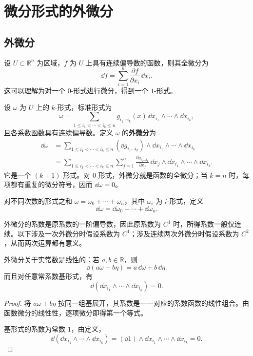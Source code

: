 \section{微分形式的外微分}

\subsection*{外微分}
设 $U\subset\mathbb R^n$ 为区域，$f$ 为 $U$ 上具有连续偏导数的函数，则其全微分为
\[
\dd f=\sum_{i=1}^n\frac{\partial f}{\partial x_i}\,\dd x_i.
\]
这可以理解为对一个 $0$-形式进行微分，得到一个 $1$-形式。

\begin{definition}
设 $\omega$ 为 $U$ 上的 $k$-形式，标准形式为
\[
\omega=\sum_{1\le i_1<\cdots<i_k\le n}
 g_{i_1\cdots i_k}(x)\,\dd x_{i_1}\wedge\cdots\wedge\dd x_{i_k},
\]
且各系数函数具有连续偏导数。定义 $\omega$ 的\textbf{外微分}为
\begin{align*}
\dd\omega
&=\sum_{1\le i_1<\cdots<i_k\le n}
 (\dd g_{i_1\cdots i_k})\wedge\dd x_{i_1}\wedge\cdots\wedge\dd x_{i_k}\\
&=\sum_{1\le i_1<\cdots<i_k\le n}\sum_{j=1}^n
 \frac{\partial g_{i_1\cdots i_k}}{\partial x_j}\,
 \dd x_j\wedge\dd x_{i_1}\wedge\cdots\wedge\dd x_{i_k}.
\end{align*}
它是一个 $(k+1)$-形式。对 $0$-形式，外微分就是函数的全微分；当 $k=n$ 时，每项都有重复的微分符号，因而 $\dd\omega=0$。

对不同次数的形式之和 $\omega=\omega_0+\cdots+\omega_n$，其中 $\omega_i$ 为 $i$-形式，定义
\[
\dd\omega=\dd\omega_0+\cdots+\dd\omega_n.
\]
\end{definition}
外微分的系数是原系数的一阶偏导数，因此原系数为 $C^1$ 时，所得系数一般仅连续。以下涉及一次外微分时假设系数为 $C^1$；涉及连续两次外微分时假设系数为 $C^2$，从而两次运算都有意义。

\begin{proposition}
外微分关于实常数是线性的：若 $a,b\in\mathbb R$，则
\[
\dd(a\omega+b\eta)=a\,\dd\omega+b\,\dd\eta.
\]
而且对任意常系数基形式，有
\[
\dd(\dd x_{i_1}\wedge\cdots\wedge\dd x_{i_k})=0.
\]
\end{proposition}
\begin{proof}
将 $a\omega+b\eta$ 按同一组基展开，其系数是一一对应的系数函数的线性组合。由函数微分的线性性，逐项微分即得第一个等式。

基形式的系数为常数 $1$，由定义，
\[
\dd(\dd x_{i_1}\wedge\cdots\wedge\dd x_{i_k})
=(\dd1)\wedge\dd x_{i_1}\wedge\cdots\wedge\dd x_{i_k}=0.
\]
\end{proof}

